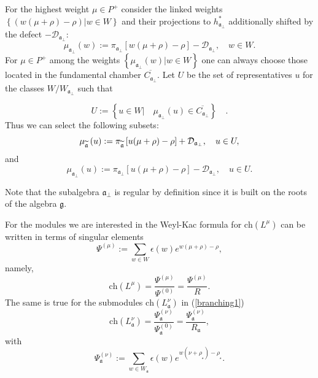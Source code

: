 \documentclass[12pt]{article}
\theoremstyle{definition}
\newcommand{\af}{\mathfrak{a}}
\newcommand{\afb}{\mathfrak{a}_{\bot}}
\begin{document}
For the highest weight $\mu \in P^{+}$ consider the linked weights $\left\{
\left( w(\mu +\rho )-\rho \right) |w\in W\right\} $ and their projections to
$h_{\afb}^{\ast }$ additionally shifted by the defect $-%
\mathcal{D}_{\afb}$:
\begin{equation*}
\mu _{\afb}\left( w\right) :=\pi _{\afb}\left[
w(\mu +\rho )-\rho \right] -\mathcal{D}_{\afb},\quad w\in W.
\end{equation*}
For $\mu \in P^{+}$ among the weights $\left\{ \mu _{\afb}\left( w\right) |w\in W\right\} $ one can always choose those located in
the fundamental chamber $\overline{C_{\afb}}$. Let $U$ be the
set of representatives $u$ for the classes $W/W_{\afb}$ such
that

\begin{equation}
U:=\left\{ u\in W|\quad \mu _{\afb}\left( u\right) \in
\overline{C_{\afb}}\right\} \quad .  \label{U-def}
\end{equation}
Thus we can select the following subsets:
\begin{equation}
\mu _{\widetilde{\mathfrak{a}}}\left( u\right) :=\pi _{\widetilde{%
\mathfrak{a}}}\left[ u(\mu +\rho )-\rho \right] +\mathcal{D}_{\af%
_{\perp }},\quad u\in U,  \label{mu-a}
\end{equation}
and
\begin{equation}
\mu _{\afb}\left( u\right) :=\pi _{\afb}\left[
u(\mu +\rho )-\rho \right] -\mathcal{D}_{\afb},\quad u\in U.
\label{mu-a-tilda}
\end{equation}

Note that the subalgebra $\mathfrak{a}_{\bot}$ is regular by definition
since it is built on the roots of the algebra $\mathfrak{g}$.

For the modules we are interested in the Weyl-Kac formula for $\mathrm{ch}%
\left( L^{\mu }\right) $ can be written in terms of singular elements \cite
{humphreys1997introduction}
\begin{equation*}
\Psi ^{\left( \mu \right) }:=\sum\limits_{w\in W}\epsilon (w)e^{w(\mu +\rho
)-\rho },
\end{equation*}
namely,
\begin{equation}
\mathrm{ch}\left( L^{\mu }\right) =\frac{\Psi ^{\left( \mu \right) }}{\Psi
^{\left( 0\right) }}=\frac{\Psi ^{\left( \mu \right) }}{R}.
\label{Weyl-Kac2}
\end{equation}
The same is true for the submodules $\mathrm{ch}\left( L_{\af}^{\nu
}\right) $ in (\ref{branching1})
\begin{equation*}
\mathrm{ch}\left( L_{\af}^{\nu }\right) =\frac{\Psi _{\af}^{\left(
\nu \right) }}{\Psi _{\af}^{\left( 0\right) }}=\frac{\Psi _{\af%
}^{\left( \nu \right) }}{R_{\af}},
\end{equation*}
with
\begin{equation*}
\Psi _{\af}^{\left( \nu \right) }:=\sum\limits_{w\in W_{\af%
}}\epsilon (w)e^{w(\nu +\rho _{_{\af}})-\rho _{_{\af}}}.
\end{equation*}
\end{document}
